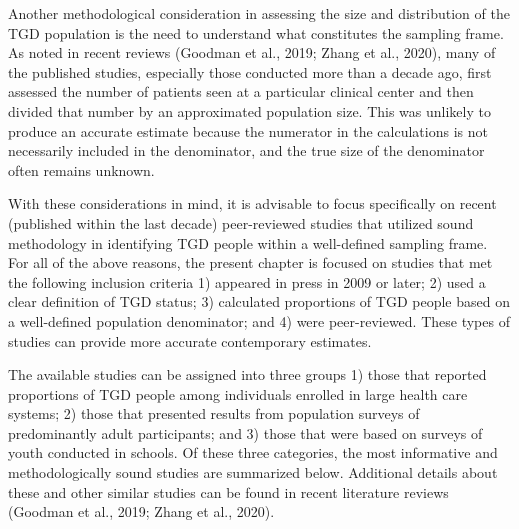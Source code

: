 \documentclass[
]{book}
\begin{document}
Another methodological consideration in
assessing the size and distribution of the TGD
population is the need to understand what constitutes the sampling frame. As noted in recent
reviews (Goodman et al., 2019; Zhang et al.,
2020), many of the published studies, especially
those conducted more than a decade ago, first
assessed the number of patients seen at a particular clinical center and then divided that number
by an approximated population size. This was
unlikely to produce an accurate estimate because
the numerator in the calculations is not necessarily included in the denominator, and the true
size of the denominator often remains unknown.

With these considerations in mind, it is advisable to focus specifically on recent (published
within the last decade) peer-reviewed studies that
utilized sound methodology in identifying TGD
people within a well-defined sampling frame. For
all of the above reasons, the present chapter is
focused on studies that met the following inclusion criteria 1) appeared in press in 2009 or later;
2) used a clear definition of TGD status; 3) calculated proportions of TGD people based on a
well-defined population denominator; and 4)
were peer-reviewed. These types of studies can
provide more accurate contemporary estimates.

The available studies can be assigned into three
groups 1) those that reported proportions of TGD
people among individuals enrolled in large health
care systems; 2) those that presented results from
population surveys of predominantly adult participants; and 3) those that were based on surveys
of youth conducted in schools. Of these three
categories, the most informative and methodologically sound studies are summarized below.
Additional details about these and other similar
studies can be found in recent literature reviews
(Goodman et al., 2019; Zhang et al., 2020).
\end{document}
